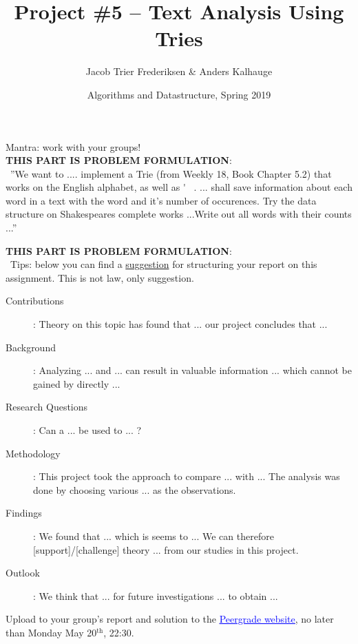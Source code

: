 \documentclass[12pt,a4paper,final]{article}
\title{Project \#5 -- Text Analysis Using Tries}
\author{Jacob Trier Frederiksen \& Anders Kalhauge}
\date{Algorithms and Datastructure, Spring 2019}
\begin{document}
\maketitle

Mantra: work with your groups! \\

\textbf{THIS PART IS PROBLEM FORMULATION}: \\ ''We want to .... implement a Trie (from Weekly 18, Book Chapter 5.2) that works on the English alphabet, as well as \' ~.
... shall save information about each word in a text with the word and it's number of occurences. Try the data structure on Shakespeares complete works ...Write out all words with their counts ...''

\textbf{THIS PART IS PROBLEM FORMULATION}: \\ Tips: below you can find a \underline{suggestion} for structuring your report on this assignment. This is not law, only suggestion.
\begin{description}
   \item[Contributions]: Theory on this topic has found that ... our project concludes that ... 
   \item[Background]: Analyzing ...  and ...  can result in valuable information ... which cannot be gained by directly ... 
   \item[Research Questions]: Can a ... be used to ... ? 
   \item[Methodology]: This project took the approach to compare ... with ... The analysis was done by choosing various ... as the observations. 
   \item[Findings]: We found that ... which is seems to ... We can therefore [support]/[challenge] theory ... from our studies in this project.
   \item[Outlook]: We think that ... for future investigations ... to obtain ... 
\end{description}

Upload to your group's report and solution to the \href{https://www.peergrade.io}{\textcolor{blue}{\underline{Peergrade website}}}, no later than Monday May 20$^\textrm{th}$, 22:30. 
\end{document}
